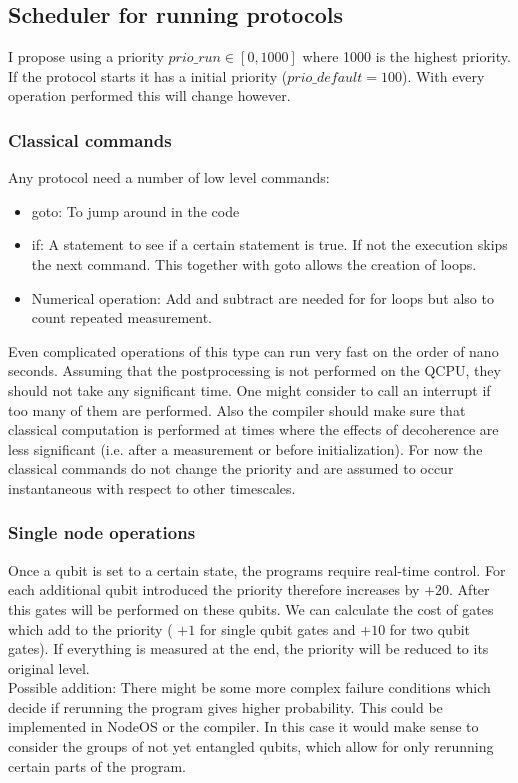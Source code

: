 \documentclass[]{article}
\begin{document}
\subsection{Scheduler for running protocols}
I propose using a priority $prio\_run \in [0,1000]$ where 1000 is the highest priority.
If the protocol starts it has a initial priority ($prio\_default=100$). With every operation performed this will change however.
\subsubsection{Classical commands}
Any protocol need a number of low level commands:
\begin{itemize}
	\item goto: To jump around in the code
	\item if: A statement to see if a certain statement is true. If not the execution skips the next command. This together with goto allows the creation of loops.
	\item Numerical operation: Add and subtract are needed for for loops but also to count repeated measurement.
\end{itemize}
Even complicated operations of this type can run very fast on the order of nano seconds. Assuming that the postprocessing is not performed on the QCPU, they should not take any significant time. One might consider to call an interrupt if too many of them are performed. Also the compiler should make sure that classical computation is performed at times where the effects of decoherence are less significant (i.e. after a measurement or before initialization). For now the classical commands do not change the priority and are assumed to occur instantaneous with respect to other timescales.

\subsubsection{Single node operations}
Once a qubit is set to a certain state, the programs require real-time control. For each additional qubit introduced the priority therefore increases by $+20$. After this gates will be performed on these qubits. We can calculate the cost of gates which add to the priority ( $+1$ for single qubit gates and $+10$ for two qubit gates). If everything is measured at the end, the priority will be reduced to its original level. \\
Possible addition: There might be some more complex failure conditions which decide if rerunning the program gives higher probability. This could be implemented in NodeOS or the compiler. In this case it would make sense to consider the groups of not yet entangled qubits, which allow for only rerunning certain parts of the program.
\end{document}
